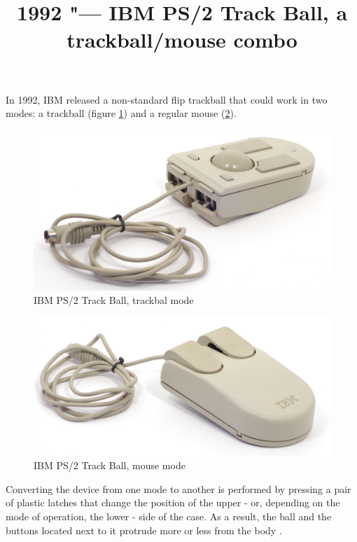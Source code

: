 \documentclass[11pt, a4paper]{article}
\begin{document}
\title{1992 "--- IBM PS/2 Track Ball, a trackball/mouse combo}
\date{}
\maketitle
In 1992, IBM released a non-standard flip trackball that could work in two modes: a trackball (figure \ref{fig:IBMConvertibleTrackball}) and a regular mouse (\ref{fig:IBMConvertibleMouse}).

\begin{figure}[h]
    \centering
    \includegraphics[scale=0.5]{1992_ibm_convertible/picball_60}
    \caption{IBM PS/2 Track Ball, trackbal mode}
    \label{fig:IBMConvertibleTrackball}
\end{figure}

\begin{figure}[h]
    \centering
    \includegraphics[scale=0.5]{1992_ibm_convertible/picmouse_60}
    \caption{IBM PS/2 Track Ball, mouse mode}
    \label{fig:IBMConvertibleMouse}
\end{figure}

Converting the device from one mode to another is performed by pressing a pair of plastic latches that change the position of the upper - or, depending on the mode of operation, the lower - side of the case. As a result, the ball and the buttons located next to it protrude more or less from the body \cite{mouses}.
\end{document}
